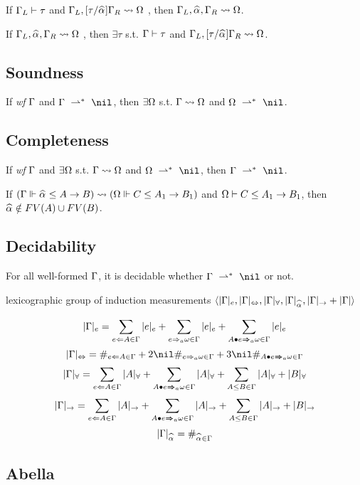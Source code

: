 \begin{lemma}[Insert]
If $\Gamma_L\vdash \tau$ and $\Gm_L, [\tau/\al]\Gm_R \sto \Om$
, then $\Gm_L, \al, \Gm_R \sto \Om$.
\end{lemma}
\begin{lemma}[Extract]
If $\Gm_L, \al, \Gm_R \sto \Om$
, then $\exists \tau$ s.t. $\Gamma\vdash\tau$ and $\Gm_L, [\tau/\al]\Gm_R \sto \Om$.
\end{lemma}

\subsection{Soundness}

\begin{theorem}[Soundness]
If \emph{wf }$\Gamma$ and $\Gm \redto \nil$, then $\exists \Omega$ s.t. $\Gamma\rightsquigarrow\Omega$ and $\Om\redto\nil$.
\end{theorem}

\subsection{Completeness}

\begin{theorem}[Completeness]
If \emph{wf }$\Gamma$ and $\exists \Omega$ s.t. $\Gamma\rightsquigarrow\Omega$ and $\Om\redto\nil$, then $\Gm \redto \nil$.
\end{theorem}

\begin{lemma}
If $(\Gm \Vdash \al \le A \to B) \sto (\Om \Vdash C \le A_1 \to B_1)$ and $\Omega \vdash C \le A_1 \to B_1$,
then $\al\notin FV(A) \cup FV(B)$.
\end{lemma}

\subsection{Decidability}
\begin{theorem}[Decidability]
For all well-formed $\Gamma$, it is decidable whether $\Gm\redto\nil$ or not.
\end{theorem}

lexicographic group of induction measurements
$\langle |\Gm|_e, |\Gm|_\Leftrightarrow, |\Gm|_\forall, |\Gm|_{\al}, |\Gm|_\to + |\Gm| \rangle$

\begin{definition}
\[|\Gm|_e = \sum_{e\Lto A\in\Gm}|e|_e + \sum_{e\To_a \jg\in\Gm}|e|_e + \sum_{\appInfAlg{A}{e}\in\Gm}|e|_e\]
\[|\Gm|_\Leftrightarrow = \#_{e\Lto A\in\Gm}
    + 2\nil\#_{e\To_a \jg\in\Gm} + 3\nil\#_{\appInfAlg{A}{e}\in\Gm}\]
\[|\Gm|_\forall = \sum_{e\Lto A\in\Gm}|A|_\forall + \sum_{\appInfAlg{A}{e}\in\Gm}|A|_\forall +
    \sum_{A\le B\in\Gm} |A|_\forall + |B|_\forall\]
\[|\Gm|_\to = \sum_{e\Lto A\in\Gm}|A|_\to + \sum_{\appInfAlg{A}{e}\in\Gm}|A|_\to +
    \sum_{A\le B\in\Gm} |A|_\to + |B|_\to\]
\[|\Gm|_{\al} = \#_{\al\in\Gm}\]
\end{definition}

\subsection{Abella}
